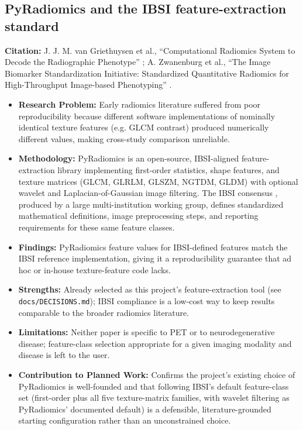 \subsection{PyRadiomics and the IBSI feature-extraction standard}
\textbf{Citation:} J. J. M. van Griethuysen et al., ``Computational Radiomics System to Decode the Radiographic Phenotype'' \cite{vangriethuysen2017pyradiomics}; A. Zwanenburg et al., ``The Image Biomarker Standardization Initiative: Standardized Quantitative Radiomics for High-Throughput Image-based Phenotyping'' \cite{zwanenburg2020ibsi}.

\begin{itemize}
    \item \textbf{Research Problem:} Early radiomics literature suffered from poor reproducibility because different software implementations of nominally identical texture features (e.g. GLCM contrast) produced numerically different values, making cross-study comparison unreliable.
    \item \textbf{Methodology:} PyRadiomics \cite{vangriethuysen2017pyradiomics} is an open-source, IBSI-aligned feature-extraction library implementing first-order statistics, shape features, and texture matrices (GLCM, GLRLM, GLSZM, NGTDM, GLDM) with optional wavelet and Laplacian-of-Gaussian image filtering. The IBSI consensus \cite{zwanenburg2020ibsi}, produced by a large multi-institution working group, defines standardized mathematical definitions, image preprocessing steps, and reporting requirements for these same feature classes.
    \item \textbf{Findings:} PyRadiomics feature values for IBSI-defined features match the IBSI reference implementation, giving it a reproducibility guarantee that ad hoc or in-house texture-feature code lacks.
    \item \textbf{Strengths:} Already selected as this project's feature-extraction tool (see \texttt{docs/DECISIONS.md}); IBSI compliance is a low-cost way to keep results comparable to the broader radiomics literature.
    \item \textbf{Limitations:} Neither paper is specific to PET or to neurodegenerative disease; feature-class selection appropriate for a given imaging modality and disease is left to the user.
    \item \textbf{Contribution to Planned Work:} Confirms the project's existing choice of PyRadiomics is well-founded and that following IBSI's default feature-class set (first-order plus all five texture-matrix families, with wavelet filtering as PyRadiomics' documented default) is a defensible, literature-grounded starting configuration rather than an unconstrained choice.
\end{itemize}

